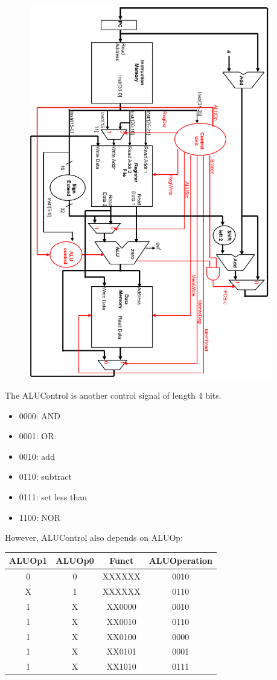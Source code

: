 \documentclass[12pt]{article}
\theoremstyle{definition}
\begin{document}
\begin{figure}[h]
\centering
\includegraphics[width = 0.95\textwidth]{12_7.png}
\end{figure}
\clearpage
The ALUControl is another control signal of length 4 bits.
\begin{itemize}
  \item 0000: AND
  \item 0001: OR
  \item 0010: add
  \item 0110: subtract
  \item 0111: set less than
  \item 1100: NOR
\end{itemize}
However, ALUControl also depends on ALUOp:
\begin{table}[h]
\centering
\begin{tabular}{|c|c|c|c|}
\hline
ALUOp1&ALUOp0&Funct&ALUOperation\\\hline
0&0&XXXXXX&0010\\\hline
X&1&XXXXXX&0110\\\hline
1&X&XX0000&0010\\\hline
1&X&XX0010&0110\\\hline
1&X&XX0100&0000\\\hline
1&X&XX0101&0001\\\hline
1&X&XX1010&0111\\\hline
\end{tabular}
\end{table}
\clearpage
\end{document}
